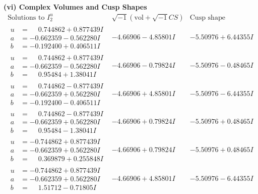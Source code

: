 \documentclass[1p]{elsarticle_modified}
\theoremstyle{definition}
\newcommand{\I}{\sqrt{-1}}
\begin{document}
\newpage\flushleft \textbf{(vi) Complex Volumes and Cusp Shapes}
$$\begin{array}{c|c|c}  
\text{Solutions to }I^u_{2}& \I (\text{vol} + \sqrt{-1}CS) & \text{Cusp shape}\\
 \hline 
\begin{aligned}
u &= \phantom{-}0.744862 + 0.877439 I \\
a &= -0.662359 - 0.562280 I \\
b &= -0.192400 + 0.406511 I\end{aligned}
 & -4.66906 - 4.85801 I & -5.50976 + 6.44355 I \\ \hline\begin{aligned}
u &= \phantom{-}0.744862 + 0.877439 I \\
a &= -0.662359 - 0.562280 I \\
b &= \phantom{-}0.95484 + 1.38041 I\end{aligned}
 & -4.66906 - 0.79824 I & -5.50976 - 0.48465 I \\ \hline\begin{aligned}
u &= \phantom{-}0.744862 - 0.877439 I \\
a &= -0.662359 + 0.562280 I \\
b &= -0.192400 - 0.406511 I\end{aligned}
 & -4.66906 + 4.85801 I & -5.50976 - 6.44355 I \\ \hline\begin{aligned}
u &= \phantom{-}0.744862 - 0.877439 I \\
a &= -0.662359 + 0.562280 I \\
b &= \phantom{-}0.95484 - 1.38041 I\end{aligned}
 & -4.66906 + 0.79824 I & -5.50976 + 0.48465 I \\ \hline\begin{aligned}
u &= -0.744862 + 0.877439 I \\
a &= -0.662359 + 0.562280 I \\
b &= \phantom{-}0.369879 + 0.255848 I\end{aligned}
 & -4.66906 + 0.79824 I & -5.50976 + 0.48465 I \\ \hline\begin{aligned}
u &= -0.744862 + 0.877439 I \\
a &= -0.662359 + 0.562280 I \\
b &= \phantom{-}1.51712 - 0.71805 I\end{aligned}
 & -4.66906 + 4.85801 I & -5.50976 - 6.44355 I \\ \hline\begin{aligned}

\end{aligned}
\end{array}$$
\end{document}
